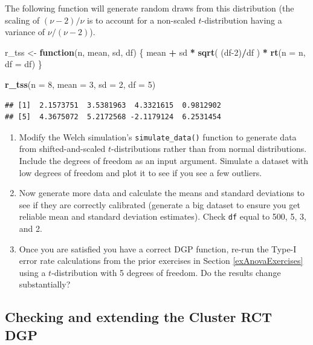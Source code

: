 \documentclass[
]{book}
\newenvironment{Shaded}{\begin{snugshade}}{\end{snugshade}}
\newcommand{\AttributeTok}[1]{\textcolor[rgb]{0.13,0.29,0.53}{#1}}
\newcommand{\ControlFlowTok}[1]{\textcolor[rgb]{0.13,0.29,0.53}{\textbf{#1}}}
\newcommand{\DecValTok}[1]{\textcolor[rgb]{0.00,0.00,0.81}{#1}}
\newcommand{\FunctionTok}[1]{\textcolor[rgb]{0.13,0.29,0.53}{\textbf{#1}}}
\newcommand{\NormalTok}[1]{#1}
\newcommand{\OtherTok}[1]{\textcolor[rgb]{0.56,0.35,0.01}{#1}}
\newcommand{\SpecialCharTok}[1]{\textcolor[rgb]{0.81,0.36,0.00}{\textbf{#1}}}
\begin{document}
The following function will generate random draws from this distribution (the scaling of \((\nu-2)/\nu\) is to account for a non-scaled \(t\)-distribution having a variance of \(\nu/(\nu-2)\)).

\begin{Shaded}
\begin{Highlighting}[]
\NormalTok{r\_tss }\OtherTok{\textless{}{-}} \ControlFlowTok{function}\NormalTok{(n, mean, sd, df) \{}
\NormalTok{  mean }\SpecialCharTok{+}\NormalTok{ sd }\SpecialCharTok{*} \FunctionTok{sqrt}\NormalTok{( (df}\DecValTok{{-}2}\NormalTok{)}\SpecialCharTok{/}\NormalTok{df ) }\SpecialCharTok{*} \FunctionTok{rt}\NormalTok{(}\AttributeTok{n =}\NormalTok{ n, }\AttributeTok{df =}\NormalTok{ df)}
\NormalTok{\}}

\FunctionTok{r\_tss}\NormalTok{(}\AttributeTok{n =} \DecValTok{8}\NormalTok{, }\AttributeTok{mean =} \DecValTok{3}\NormalTok{, }\AttributeTok{sd =} \DecValTok{2}\NormalTok{, }\AttributeTok{df =} \DecValTok{5}\NormalTok{)}
\end{Highlighting}
\end{Shaded}

\begin{verbatim}
## [1]  2.1573751  3.5381963  4.3321615  0.9812902
## [5]  4.3675072  5.2172568 -2.1179124  6.2531454
\end{verbatim}

\begin{enumerate}
\def\labelenumi{\arabic{enumi}.}
\item
  Modify the Welch simulation's \texttt{simulate\_data()} function to generate data from shifted-and-scaled \(t\)-distributions rather than from normal distributions. Include the degrees of freedom as an input argument.
  Simulate a dataset with low degrees of freedom and plot it to see if you see a few outliers.
\item
  Now generate more data and calculate the means and standard deviations to see if they are correctly calibrated (generate a big dataset to ensure you get reliable mean and standard deviation estimates). Check \texttt{df} equal to 500, 5, 3, and 2.
\item
  Once you are satisfied you have a correct DGP function, re-run the Type-I error rate calculations from the prior exercises in Section \ref{exAnovaExercises} using a \(t\)-distribution with 5 degrees of freedom.
  Do the results change substantially?
\end{enumerate}

\subsection{Checking and extending the Cluster RCT DGP}\label{checking-and-extending-the-cluster-rct-dgp}
\end{document}
